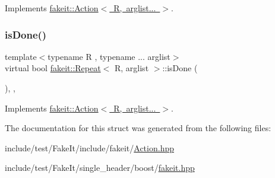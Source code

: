 Implements \mbox{\hyperlink{structfakeit_1_1Action_a0b9ab2c889a54c07dcaa8efc101a5cbc}{fakeit\+::\+Action$<$ R, arglist... $>$}}.

\mbox{\label{structfakeit_1_1Repeat_a4822600fad5bce408fcd03d71ff333eb}} 
\subsubsection{\texorpdfstring{isDone()}{isDone()}\hspace{0.1cm}{\footnotesize\ttfamily [9/9]}}
{\footnotesize\ttfamily template$<$typename R , typename ... arglist$>$ \\
virtual bool \mbox{\hyperlink{structfakeit_1_1Repeat}{fakeit\+::\+Repeat}}$<$ R, arglist $>$\+::is\+Done (\begin{DoxyParamCaption}{ }\end{DoxyParamCaption})\hspace{0.3cm}{\ttfamily [inline]}, {\ttfamily [override]}, {\ttfamily [virtual]}}



Implements \mbox{\hyperlink{structfakeit_1_1Action_a0b9ab2c889a54c07dcaa8efc101a5cbc}{fakeit\+::\+Action$<$ R, arglist... $>$}}.



The documentation for this struct was generated from the following files\+:\begin{DoxyCompactItemize}
\item 
include/test/\+Fake\+It/include/fakeit/\mbox{\hyperlink{Action_8hpp}{Action.\+hpp}}\item 
include/test/\+Fake\+It/single\+\_\+header/boost/\mbox{\hyperlink{single__header_2boost_2fakeit_8hpp}{fakeit.\+hpp}}\end{DoxyCompactItemize}

